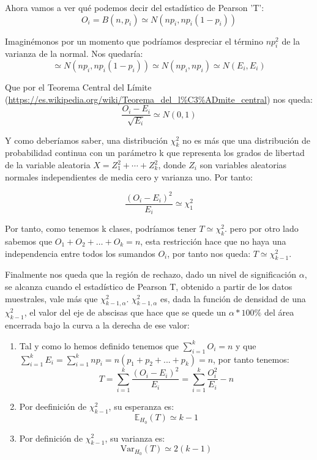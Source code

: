 \documentclass[nochap]{apuntes}
\begin{document}
Ahora vamos a ver qué podemos decir del estadístico de Pearson 'T':
\[
O_i=B(n,p_i) \simeq N(np_i, np_i(1-p_i))
\]

Imaginémonos por un momento que podríamos despreciar el término $np_i^2$ de la varianza de la normal. Nos quedaría:
\[
\simeq N(np_i, np_i(1-p_i)) \simeq N(np_i, np_i) \simeq N(E_i, E_i)
\]

Que por el Teorema Central del Límite (\url{https://es.wikipedia.org/wiki/Teorema_del_l%C3%ADmite_central}) nos queda:
\[
\frac{O_i-E_i}{\sqrt{E_i}} \simeq N(0,1)
\]

Y como deberíamos saber, una distribución $\chi^2_k$  no es más que una distribución de probabilidad continua con un parámetro k que representa los grados de libertad de la variable aleatoria $X = Z_1^2 + \cdots + Z_k^2$, donde $Z_i$ son variables aleatorias normales independientes de media cero y varianza uno. Por tanto:

\[
\frac{(O_i-E_i)^2}{E_i} \simeq \chi^2_1
\]

Por tanto, como tenemos k clases, podríamos tener $T\simeq \chi^2_k$. pero por otro lado sabemos que $O_1+O_2+…+O_k=n$, esta restricción hace que no haya una independencia entre todos los sumandos $O_i$, por tanto nos queda: $T\simeq \chi^2_{k-1}$.

Finalmente nos queda que la región de rechazo, dado un nivel de significación $\alpha$, se alcanza cuando el estadístico de Pearson T, obtenido a partir de los datos muestrales, vale más que $\chi^2_{k-1,α}$. $\chi^2_{k-1,α}$ es, dada la función de densidad de una $\chi^2_{k-1}$, el valor del eje de abscisas que hace que se quede un $\alpha*100\%$ del área encerrada bajo la curva a la derecha de ese valor:


\obs
\begin{enumerate}
\item  Tal y como lo hemos definido tenemos que $\sum_{i=1}^k O_i = n$ y que $\sum_{i=1}^k E_i = \sum_{i=1}^k np_i= n(p_1+p_2+...+p_k) = n$, por tanto tenemos:
\[
T=\sum_{i=1}^k \frac{(O_i-E_i)^2}{E_i} = \sum_{i=1}^k \frac{O_i^2}{E_i}-n
\]

\item Por deefinición de $\chi^2_{k-1}$, su esperanza es:
\[
\mathbb{E}_{H_0}(T) \simeq k-1
\]

\item Por definición de $\chi^2_{k-1}$, su varianza es:
\[
\mathrm{Var}_{H_0}(T) \simeq 2(k-1)
\]




\end{enumerate}
\end{document}
